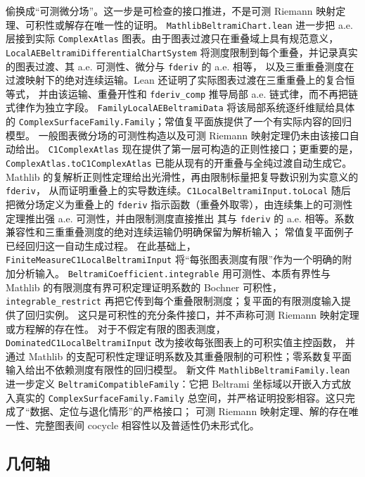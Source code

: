 \documentclass[UTF8,fontset=none,a4paper,11pt]{ctexart}
\begin{document}
偷换成“可测微分场”。这一步是可检查的接口推进，不是可测 Riemann 映射定理、可积性或解存在唯一性的证明。
\texttt{MathlibBeltramiChart}\allowbreak\texttt{.lean} 进一步把 a.e. 层接到实际
\texttt{ComplexAtlas} 图表。由于图表过渡只在重叠域上具有规范意义，\texttt{LocalAEBeltramiDifferentialChartSystem}
将测度限制到每个重叠，并记录真实的图表过渡、其 a.e. 可测性、微分与 \texttt{fderiv} 的 a.e. 相等，
以及三重重叠测度在过渡映射下的绝对连续运输。Lean 还证明了实际图表过渡在三重重叠上的复合恒等式，
并由该运输、重叠开性和 \texttt{fderiv\_comp} 推导局部 a.e. 链式律，而不再把链式律作为独立字段。
\texttt{FamilyLocalAEBeltramiData} 将该局部系统逐纤维赋给具体的
\texttt{ComplexSurfaceFamily.Family}；常值复平面族提供了一个有实际内容的回归模型。
一般图表微分场的可测性构造以及可测 Riemann 映射定理仍未由该接口自动给出。
\texttt{C1ComplexAtlas} 现在提供了第一层可构造的正则性接口；更重要的是，
\texttt{ComplexAtlas.toC1ComplexAtlas} 已能从现有的开重叠与全纯过渡自动生成它。
Mathlib 的复解析正则性定理给出光滑性，再由限制标量把复导数识别为实意义的 \texttt{fderiv}，
从而证明重叠上的实导数连续。\texttt{C1LocalBeltramiInput.toLocal} 随后把微分场定义为重叠上的
\texttt{fderiv} 指示函数（重叠外取零），由连续集上的可测性定理推出强 a.e. 可测性，并由限制测度直接推出
其与 \texttt{fderiv} 的 a.e. 相等。系数兼容性和三重重叠测度的绝对连续运输仍明确保留为解析输入；
常值复平面例子已经回归这一自动生成过程。
在此基础上，\texttt{FiniteMeasureC1LocalBeltramiInput} 将“每张图表测度有限”作为一个明确的附加分析输入。
\texttt{BeltramiCoefficient.integrable} 用可测性、本质有界性与 Mathlib 的有限测度有界可积定理证明系数的
Bochner 可积性，\texttt{integrable\_restrict} 再把它传到每个重叠限制测度；复平面的有限测度输入提供了回归实例。
这只是可积性的充分条件接口，并不声称可测 Riemann 映射定理或方程解的存在性。
对于不假定有限的图表测度，\texttt{DominatedC1LocalBeltramiInput} 改为接收每张图表上的可积实值主控函数，
并通过 Mathlib 的支配可积性定理证明系数及其重叠限制的可积性；零系数复平面输入给出不依赖测度有限性的回归模型。
新文件 \texttt{MathlibBeltramiFamily}\allowbreak\texttt{.lean} 进一步定义
\texttt{BeltramiCompatibleFamily}：它把 Beltrami 坐标域以开嵌入方式放入真实的
\texttt{ComplexSurfaceFamily.Family} 总空间，并严格证明投影相容。这只完成了“数据、定位与退化情形”的严格接口；
可测 Riemann 映射定理、解的存在唯一性、完整图表间 cocycle 相容性以及普适性仍未形式化。

\subsection{几何轴}
\end{document}
